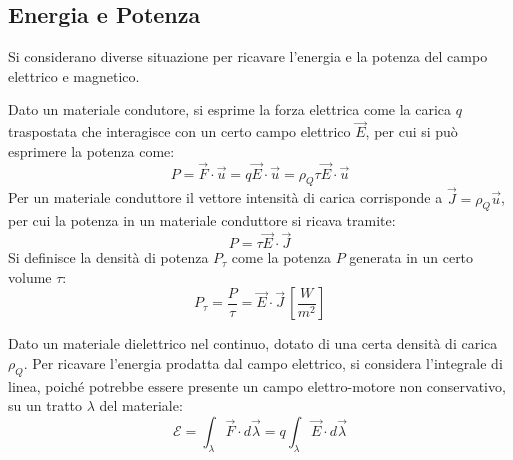 \documentclass{article}
\numberwithin{equation}{subsection}
\begin{document}
\subsection{Energia e Potenza}

Si considerano diverse situazione per ricavare l'energia e la potenza del campo elettrico e magnetico.

Dato un materiale condutore, si esprime la forza elettrica come la carica $q$ traspostata che interagisce con un certo campo elettrico $\vec{E}$, per cui si può esprimere 
la potenza come:
\begin{equation*}
    P=\vec{F}\cdot\vec{u}=q\vec{E}\cdot\vec{u}=\rho_Q\tau\vec{E}\cdot\vec{u}
\end{equation*}
Per un materiale conduttore il vettore intensità di carica corrisponde a $\vec{J}=\rho_Q\vec{u}$, per cui la potenza in un materiale conduttore si ricava tramite:
\begin{equation*}
    P=\tau\vec{E}\cdot\vec{J}
\end{equation*}
Si definisce la densità di potenza $P_\tau$ come la potenza $P$ generata in un certo volume $\tau$: 
\begin{equation}
    P_{\tau}=\displaystyle\frac{P}{\tau}=\vec{E}\cdot\vec{J}\,\left[\frac{W}{m^2}\right]
\end{equation}


Dato un materiale dielettrico nel continuo, dotato di una certa densità di carica $\rho_Q$. Per ricavare l'energia prodatta dal campo elettrico, si considera l'integrale 
di linea, poiché potrebbe essere presente un campo elettro-motore non conservativo, su un tratto $\lambda$ del materiale:
\begin{equation*}
    \mathscr{E}=\displaystyle\int_{\lambda}\vec{F}\cdot d\vec{\lambda}=q\int_{\lambda}\vec{E}\cdot d\vec{\lambda}
\end{equation*}

\begin{center}
\end{center}
\end{document}
